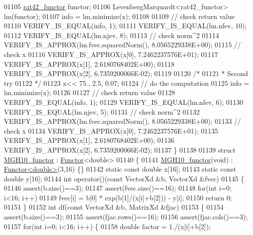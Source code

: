 \begin{DoxyCode}
01105   \hyperlink{structrat42__functor}{rat42\_functor} functor;
01106   LevenbergMarquardt<rat42\_functor> lm(functor);
01107   info = lm.minimize(x);
01108 
01109   \textcolor{comment}{// check return value}
01110   VERIFY\_IS\_EQUAL(info, 1);
01111   VERIFY\_IS\_EQUAL(lm.nfev, 10);
01112   VERIFY\_IS\_EQUAL(lm.njev, 8);
01113   \textcolor{comment}{// check norm^2}
01114   VERIFY\_IS\_APPROX(lm.fvec.squaredNorm(), 8.0565229338E+00);
01115   \textcolor{comment}{// check x}
01116   VERIFY\_IS\_APPROX(x[0], 7.2462237576E+01);
01117   VERIFY\_IS\_APPROX(x[1], 2.6180768402E+00);
01118   VERIFY\_IS\_APPROX(x[2], 6.7359200066E-02);
01119 
01120   \textcolor{comment}{/*}
01121 \textcolor{comment}{   * Second try}
01122 \textcolor{comment}{   */}
01123   x<< 75., 2.5, 0.07;
01124   \textcolor{comment}{// do the computation}
01125   info = lm.minimize(x);
01126 
01127   \textcolor{comment}{// check return value}
01128   VERIFY\_IS\_EQUAL(info, 1);
01129   VERIFY\_IS\_EQUAL(lm.nfev, 6);
01130   VERIFY\_IS\_EQUAL(lm.njev, 5);
01131   \textcolor{comment}{// check norm^2}
01132   VERIFY\_IS\_APPROX(lm.fvec.squaredNorm(), 8.0565229338E+00);
01133   \textcolor{comment}{// check x}
01134   VERIFY\_IS\_APPROX(x[0], 7.2462237576E+01);
01135   VERIFY\_IS\_APPROX(x[1], 2.6180768402E+00);
01136   VERIFY\_IS\_APPROX(x[2], 6.7359200066E-02);
01137 \}
01138 
01139 \textcolor{keyword}{struct }\hyperlink{struct_m_g_h10__functor}{MGH10\_functor} : \hyperlink{struct_functor}{Functor}<double>
01140 \{
01141     \hyperlink{struct_m_g_h10__functor}{MGH10\_functor}(\textcolor{keywordtype}{void}) : \hyperlink{struct_functor}{Functor<double>}(3,16) \{\}
01142     \textcolor{keyword}{static} \textcolor{keyword}{const} \textcolor{keywordtype}{double} x[16];
01143     \textcolor{keyword}{static} \textcolor{keyword}{const} \textcolor{keywordtype}{double} y[16];
01144     \textcolor{keywordtype}{int} operator()(\textcolor{keyword}{const} VectorXd &b, VectorXd &fvec)
01145     \{
01146         assert(b.size()==3);
01147         assert(fvec.size()==16);
01148         \textcolor{keywordflow}{for}(\textcolor{keywordtype}{int} i=0; i<16; i++)
01149             fvec[i] =  b[0] * exp(b[1]/(x[i]+b[2])) - y[i];
01150         \textcolor{keywordflow}{return} 0;
01151     \}
01152     \textcolor{keywordtype}{int} df(\textcolor{keyword}{const} VectorXd &b, MatrixXd &fjac)
01153     \{
01154         assert(b.size()==3);
01155         assert(fjac.rows()==16);
01156         assert(fjac.cols()==3);
01157         \textcolor{keywordflow}{for}(\textcolor{keywordtype}{int} i=0; i<16; i++) \{
01158             \textcolor{keywordtype}{double} factor = 1./(x[i]+b[2]);

\end{DoxyCode}
